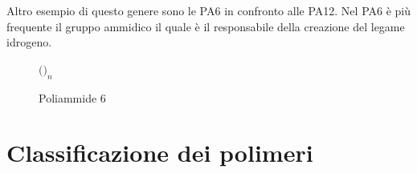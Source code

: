 Altro esempio di questo genere sono le \ac{PA}6 in confronto alle \ac{PA}12.
Nel \ac{PA}6 è più frequente il gruppo ammidico
il quale è il responsabile della creazione del legame idrogeno.

\begin{figure}
\centering
$\Big($$\Big)_n$
\caption{Poliammide 6}
\label{fig:PA6}
\end{figure}

\chapter{Classificazione dei polimeri}\label{chp:Classificazione}
